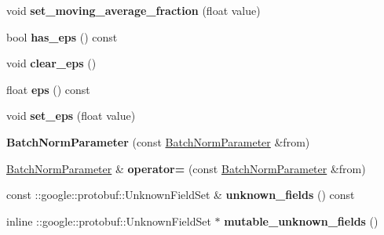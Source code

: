 \begin{DoxyCompactItemize}
\item 
\mbox{\label{classcaffe_1_1_batch_norm_parameter_a35af63a119670da04c8e4b40e41002cd}} 
void {\bfseries set\+\_\+moving\+\_\+average\+\_\+fraction} (float value)
\item 
\mbox{\label{classcaffe_1_1_batch_norm_parameter_a7eac5264f0529366a20d05e0891d58ac}} 
bool {\bfseries has\+\_\+eps} () const
\item 
\mbox{\label{classcaffe_1_1_batch_norm_parameter_ae5226aba1ce892c2cb1e95552510c1f9}} 
void {\bfseries clear\+\_\+eps} ()
\item 
\mbox{\label{classcaffe_1_1_batch_norm_parameter_ae2d35b5bec59906be4d0e5e86f3300cd}} 
float {\bfseries eps} () const
\item 
\mbox{\label{classcaffe_1_1_batch_norm_parameter_a89b02ef090d3de548a0fea8aa8f37d93}} 
void {\bfseries set\+\_\+eps} (float value)
\item 
\mbox{\label{classcaffe_1_1_batch_norm_parameter_a8c87c88910e67dca458ee99e8c1a6308}} 
{\bfseries Batch\+Norm\+Parameter} (const \mbox{\hyperlink{classcaffe_1_1_batch_norm_parameter}{Batch\+Norm\+Parameter}} \&from)
\item 
\mbox{\label{classcaffe_1_1_batch_norm_parameter_a5811486a97735f738609b158ea96238d}} 
\mbox{\hyperlink{classcaffe_1_1_batch_norm_parameter}{Batch\+Norm\+Parameter}} \& {\bfseries operator=} (const \mbox{\hyperlink{classcaffe_1_1_batch_norm_parameter}{Batch\+Norm\+Parameter}} \&from)
\item 
\mbox{\label{classcaffe_1_1_batch_norm_parameter_a4e94cabd70108e206ec63b00eb04d11c}} 
const \+::google\+::protobuf\+::\+Unknown\+Field\+Set \& {\bfseries unknown\+\_\+fields} () const
\item 
\mbox{\label{classcaffe_1_1_batch_norm_parameter_a86a98559df45442090d56eb35f7f0286}} 
inline \+::google\+::protobuf\+::\+Unknown\+Field\+Set $\ast$ {\bfseries mutable\+\_\+unknown\+\_\+fields} ()

\end{DoxyCompactItemize}
